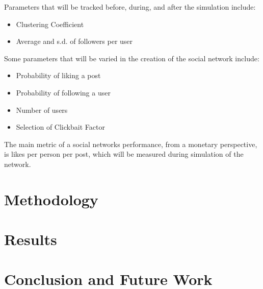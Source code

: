 \documentclass{article}
\begin{document}
Parameters that will be tracked before, during, and after the simulation include:
\begin{itemize}
    \item Clustering Coefficient
    \item Average and s.d. of followers per user
\end{itemize}

Some parameters that will be varied in the creation of the social network include:
\begin{itemize}
    \item Probability of liking a post
    \item Probability of following a user
    \item Number of users
    \item Selection of Clickbait Factor
\end{itemize}

The main metric of a social networks performance, from a monetary perspective,
is likes per person per post, which will be measured during simulation of the network.
\section{Methodology}

\section{Results}
\section{Conclusion and Future Work}
\end{document}
